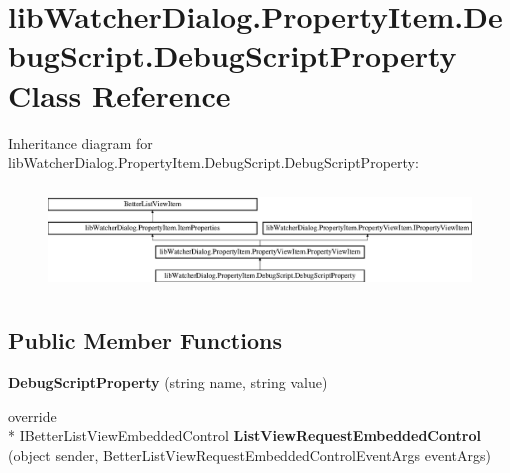 \hypertarget{classlib_watcher_dialog_1_1_property_item_1_1_debug_script_1_1_debug_script_property}{\section{lib\+Watcher\+Dialog.\+Property\+Item.\+Debug\+Script.\+Debug\+Script\+Property Class Reference}
\label{classlib_watcher_dialog_1_1_property_item_1_1_debug_script_1_1_debug_script_property}
}
Inheritance diagram for lib\+Watcher\+Dialog.\+Property\+Item.\+Debug\+Script.\+Debug\+Script\+Property\+:\begin{figure}[H]
\begin{center}
\leavevmode
\includegraphics[height=2.800000cm]{classlib_watcher_dialog_1_1_property_item_1_1_debug_script_1_1_debug_script_property}
\end{center}
\end{figure}
\subsection*{Public Member Functions}
\begin{DoxyCompactItemize}
\item 
\hypertarget{classlib_watcher_dialog_1_1_property_item_1_1_debug_script_1_1_debug_script_property_aebc60d55691f1bdef89d70536dfae830}{{\bfseries Debug\+Script\+Property} (string name, string value)}\label{classlib_watcher_dialog_1_1_property_item_1_1_debug_script_1_1_debug_script_property_aebc60d55691f1bdef89d70536dfae830}

\item 
\hypertarget{classlib_watcher_dialog_1_1_property_item_1_1_debug_script_1_1_debug_script_property_a273e80e96e7f59337ef96ee1c5874f6c}{override \\*
I\+Better\+List\+View\+Embedded\+Control {\bfseries List\+View\+Request\+Embedded\+Control} (object sender, Better\+List\+View\+Request\+Embedded\+Control\+Event\+Args event\+Args)}\label{classlib_watcher_dialog_1_1_property_item_1_1_debug_script_1_1_debug_script_property_a273e80e96e7f59337ef96ee1c5874f6c}

\end{DoxyCompactItemize}
